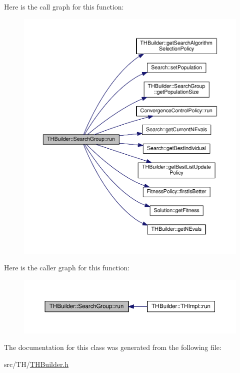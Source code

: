Here is the call graph for this function\+:
\nopagebreak
\begin{figure}[H]
\begin{center}
\leavevmode
\includegraphics[width=350pt]{classTHBuilder_1_1SearchGroup_ac8c33d89ddd52e38fb23d7102d9086e0_cgraph}
\end{center}
\end{figure}




Here is the caller graph for this function\+:
\nopagebreak
\begin{figure}[H]
\begin{center}
\leavevmode
\includegraphics[width=350pt]{classTHBuilder_1_1SearchGroup_ac8c33d89ddd52e38fb23d7102d9086e0_icgraph}
\end{center}
\end{figure}




The documentation for this class was generated from the following file\+:\begin{DoxyCompactItemize}
\item 
src/\+T\+H/\hyperlink{THBuilder_8h}{T\+H\+Builder.\+h}\end{DoxyCompactItemize}
